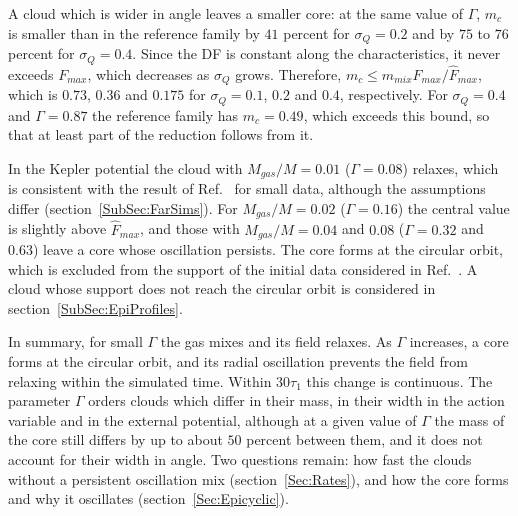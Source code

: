 A cloud which is wider in angle leaves a smaller core: at the same value of $\Gamma$, $m_c$ is smaller than in the reference family by $41$ percent for $\sigma_Q = 0.2$ and by $75$ to $76$ percent for $\sigma_Q = 0.4$. Since the DF is constant along the characteristics, it never exceeds $F_{max}$, which decreases as $\sigma_Q$ grows. Therefore, $m_c\leq m_{mix}F_{max}/\hat{F}_{max}$, which is $0.73$, $0.36$ and $0.175$ for $\sigma_Q = 0.1$, $0.2$ and $0.4$, respectively. For $\sigma_Q = 0.4$ and $\Gamma = 0.87$ the reference family has $m_c = 0.49$, which exceeds this bound, so that at least part of the reduction follows from it.

In the Kepler potential the cloud with $M_{gas}/M = 0.01$ ($\Gamma = 0.08$) relaxes, which is consistent with the result of Ref.~\cite{sCjL26} for small data, although the assumptions differ (section~\ref{SubSec:FarSims}). For $M_{gas}/M = 0.02$ ($\Gamma = 0.16$) the central value is slightly above $\hat{F}_{max}$, and those with $M_{gas}/M = 0.04$ and $0.08$ ($\Gamma = 0.32$ and $0.63$) leave a core whose oscillation persists. The core forms at the circular orbit, which is excluded from the support of the initial data considered in Ref.~\cite{sCjL26}. A cloud whose support does not reach the circular orbit is considered in section~\ref{SubSec:EpiProfiles}.

In summary, for small $\Gamma$ the gas mixes and its field relaxes. As $\Gamma$ increases, a core forms at the circular orbit, and its radial oscillation prevents the field from relaxing within the simulated time. Within $30\tau_1$ this change is continuous. The parameter $\Gamma$ orders clouds which differ in their mass, in their width in the action variable and in the external potential, although at a given value of $\Gamma$ the mass of the core still differs by up to about $50$ percent between them, and it does not account for their width in angle. Two questions remain: how fast the clouds without a persistent oscillation mix (section~\ref{Sec:Rates}), and how the core forms and why it oscillates (section~\ref{Sec:Epicyclic}).
